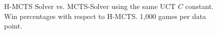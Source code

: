 \begin{figure}[ht]
     \caption[H-MCTS and UCT with suboptimal $C$ values]{H-MCTS Solver vs. MCTS-Solver using the same UCT $C$ constant. \\ Win percentages with respect to H-MCTS. 1,000 games per data point.}
     \label{fig:h-mcts-s_v_mcts-s_uct_subopt_c}
\end{figure}

